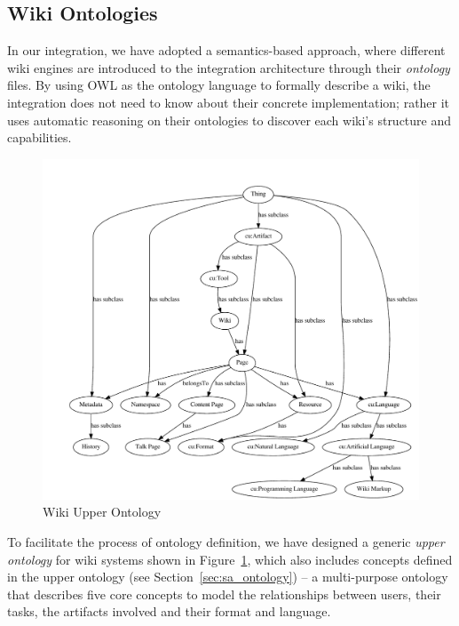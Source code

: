 \subsection{Wiki Ontologies}
In our \wikinlp integration, we have adopted a semantics-based approach, where different wiki engines are introduced to the integration architecture through their \emph{ontology} files. By using OWL as the ontology language to formally describe a wiki, the integration does not need to know about their concrete implementation; rather it uses automatic reasoning on their ontologies to discover each wiki's structure and capabilities.

\begin{figure}
\centering
\includegraphics[scale=0.7]{pictures/wiki_onto.pdf}
\caption{Wiki Upper Ontology}
\label{fig:wiki_onto}
\end{figure}

To facilitate the process of ontology definition, we have designed a generic \emph{upper ontology} for wiki systems shown in Figure~\ref{fig:wiki_onto}, which also includes concepts defined in the \sa upper ontology (see Section~\ref{sec:sa_ontology}) -- a multi-purpose ontology that describes five core concepts to model the relationships between users, their tasks, the artifacts involved and their format and language.  

